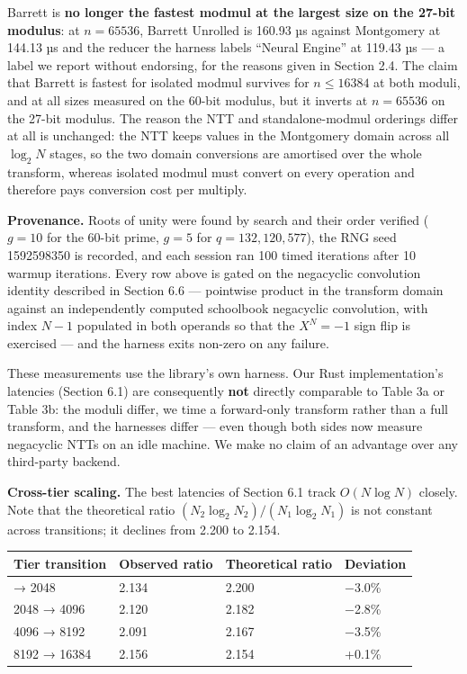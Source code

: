 Barrett is \textbf{no longer the fastest modmul at the largest size on the 27-bit modulus}: at \(n = 65536\), Barrett Unrolled is 160.93 µs against Montgomery at 144.13 µs and the reducer the harness labels ``Neural Engine'' at 119.43 µs --- a label we report without endorsing, for the reasons given in Section 2.4. The claim that Barrett is fastest for isolated modmul survives for \(n \leq 16384\) at both moduli, and at all sizes measured on the 60-bit modulus, but it inverts at \(n = 65536\) on the 27-bit modulus. The reason the NTT and standalone-modmul orderings differ at all is unchanged: the NTT keeps values in the Montgomery domain across all \(\log_2 N\) stages, so the two domain conversions are amortised over the whole transform, whereas isolated modmul must convert on every operation and therefore pays conversion cost per multiply.

\textbf{Provenance.} Roots of unity were found by search and their order verified (\(g = 10\) for the 60-bit prime, \(g = 5\) for \(q = 132{,}120{,}577\)), the RNG seed 1592598350 is recorded, and each session ran 100 timed iterations after 10 warmup iterations. Every row above is gated on the negacyclic convolution identity described in Section 6.6 --- pointwise product in the transform domain against an independently computed schoolbook negacyclic convolution, with index \(N - 1\) populated in both operands so that the \(X^N = -1\) sign flip is exercised --- and the harness exits non-zero on any failure.

These measurements use the library's own harness. Our Rust implementation's latencies (Section 6.1) are consequently \textbf{not} directly comparable to Table 3a or Table 3b: the moduli differ, we time a forward-only transform rather than a full transform, and the harnesses differ --- even though both sides now measure negacyclic NTTs on an idle machine. We make no claim of an advantage over any third-party backend.

\textbf{Cross-tier scaling.} The best latencies of Section 6.1 track \(O(N \log N)\) closely. Note that the theoretical ratio \((N_2 \log_2 N_2)/(N_1 \log_2 N_1)\) is not constant across transitions; it declines from 2.200 to 2.154.

{\def\LTcaptype{none} %
\begin{longtable}[]{@{}llll@{}}
\toprule\noalign{}
Tier transition & Observed ratio & Theoretical ratio & Deviation \\
\midrule\noalign{}
\endhead
\bottomrule\noalign{}
\endlastfoot
1024 → 2048 & 2.134 & 2.200 & −3.0\% \\
2048 → 4096 & 2.120 & 2.182 & −2.8\% \\
4096 → 8192 & 2.091 & 2.167 & −3.5\% \\
8192 → 16384 & 2.156 & 2.154 & +0.1\% \\
\end{longtable}
}

